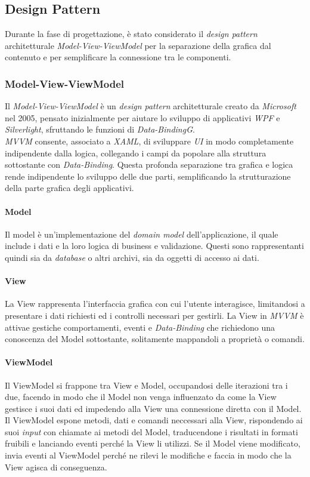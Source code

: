 \subsection{Design Pattern}
Durante la fase di progettazione, è stato considerato il \textit{design pattern} architetturale \textit{Model-View-ViewModel} per la separazione della grafica dal contenuto e per semplificare la connessione tra le componenti.
\subsubsection{Model-View-ViewModel}
Il \textit{Model-View-ViewModel} è un \textit{design pattern} architetturale creato da \textit{Microsoft} nel 2005, pensato inizialmente per aiutare lo sviluppo di applicativi \textit{WPF} e \textit{Silverlight}, sfruttando le funzioni di \textit{Data-Binding\textit{G}}.
\\
\textit{MVVM} consente, associato a \textit{XAML}, di sviluppare \textit{UI} in modo completamente indipendente dalla logica, collegando i campi da popolare alla struttura sottostante con \textit{Data-Binding}. Questa profonda separazione tra grafica e logica rende indipendente lo sviluppo delle due parti, semplificando la strutturazione della parte grafica degli applicativi.

\paragraph{Model}
Il model è un'implementazione del \textit{domain model} dell'applicazione, il quale include i dati e la loro logica di business e validazione. Questi sono rappresentanti quindi sia da \textit{database} o altri archivi, sia da oggetti di accesso ai dati.
\paragraph{View}
La View rappresenta l'interfaccia grafica con cui l'utente interagisce, limitandosi a presentare i dati richiesti ed i controlli necessari per gestirli. La View in \textit{MVVM} è attivae gestiche comportamenti, eventi e \textit{Data-Binding} che richiedono una conoscenza del Model sottostante, solitamente mappandoli a proprietà o comandi.
\paragraph{ViewModel}
Il ViewModel si frappone tra View e Model, occupandosi delle iterazioni tra i due, facendo in modo che il Model non venga influenzato da come la View gestisce i suoi dati ed impedendo alla View una connessione diretta con il Model. Il ViewModel espone metodi, dati e comandi neccessari alla View, rispondendo ai suoi \textit{input} con chiamate ai metodi del Model, traducendone i risultati in formati fruibili e lanciando eventi perché la View li utilizzi. Se il Model viene modificato, invia eventi al ViewModel perché ne rilevi le modifiche e faccia in modo che la View agisca di conseguenza.

